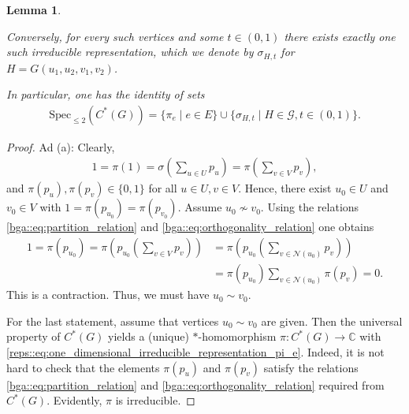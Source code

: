 \documentclass[a4paper]{amsart}
\newtheorem{lemma}[thm]{Lemma}
\newcommand{\C}{\mathbb{C}}
\begin{document}
\begin{lemma}
\begin{enumerate}[label=(\alph*)]
        Conversely, for every such vertices and some $t \in (0,1)$ there exists exactly one such irreducible representation, which we denote by $\sigma_{H, t}$ for $H = G(u_1, u_2, v_1, v_2)$.
    \end{enumerate}
    In particular, one has the identity of sets
    \begin{align*}
        \mathrm{Spec}_{\leq 2}(C^\ast(G)) = \{ \pi_e \mid e \in E \} \cup \{ \sigma_{H, t} \mid H \in \mathcal{G}, t \in (0,1) \}.
    \end{align*}
\end{lemma}

\begin{proof}
    Ad (a): 
    Clearly,
    \begin{align*}
        1 = \pi(1) = \sigma\left(\sum_{u \in U} p_u\right) = \pi\left(\sum_{v \in V} p_v\right),
    \end{align*}
    and $\pi(p_u), \pi(p_v) \in \{0,1\}$ for all $u \in U, v \in V$. Hence, there exist $u_0 \in U$ and $v_0 \in V$ with $1 = \pi(p_{u_0}) = \pi(p_{v_0})$. Assume $u_0 \not \sim v_0$. Using the relations \eqref{bga::eq:partition_relation} and \eqref{bga::eq:orthogonality_relation} one obtains
    \begin{align*}
        1 = \pi(p_{u_0}) = \pi\left(p_{u_0} \left( \sum_{v \in V} p_v \right) \right) &= \pi\left(p_{u_0} \left( \sum_{v \in \mathcal{N}(u_0)} p_v \right) \right) \\
            &= \pi(p_{u_0}) \sum_{v \in \mathcal{N}(u_0)} \pi(p_v) = 0.
    \end{align*}
    This is a contraction. Thus, we must have $u_0 \sim v_0$.

    For the last statement, assume that vertices $u_0 \sim v_0$ are given. Then the universal property of $C^\ast(G)$ yields a (unique) $\ast$-homomorphism $\pi: C^\ast(G) \to \C$ with \eqref{reps::eq:one_dimensional_irreducible_representation_pi_e}. Indeed, it is not hard to check that the elements $\pi(p_u)$ and $\pi(p_v)$ satisfy the relations \eqref{bga::eq:partition_relation} and \eqref{bga::eq:orthogonality_relation} required from $C^\ast(G)$. Evidently, $\pi$ is irreducible.


\end{proof}
\end{document}
